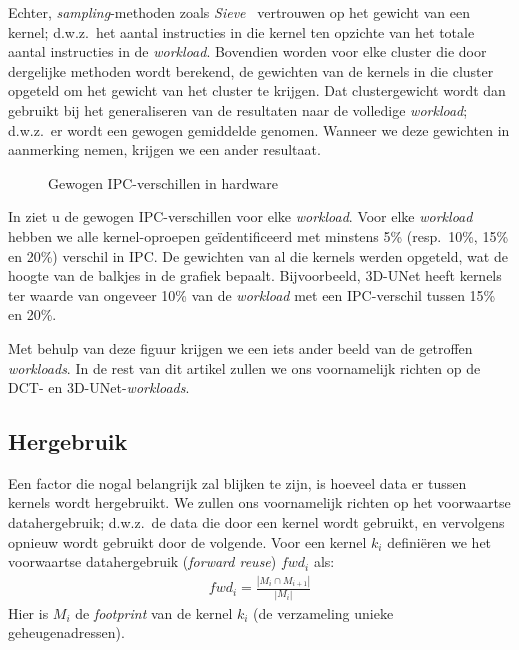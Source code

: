 \documentclass[5p,numvwe]{elsarticle}
\begin{document}
    Echter, \textit{sampling}-methoden zoals \textit{Sieve}~\cite{sieve} vertrouwen op het gewicht van een kernel; d.w.z.\ het aantal instructies in die kernel ten opzichte van het totale aantal instructies in de \textit{workload}.
    Bovendien worden voor elke cluster die door dergelijke methoden wordt berekend, de gewichten van de kernels in die cluster opgeteld om het gewicht van het cluster te krijgen.
    Dat clustergewicht wordt dan gebruikt bij het generaliseren van de resultaten naar de volledige \textit{workload}; d.w.z.\ er wordt een gewogen gemiddelde genomen.
    Wanneer we deze gewichten in aanmerking nemen, krijgen we een ander resultaat.

    \begin{figure}[ht]
        \centering
        \caption{Gewogen IPC-verschillen in hardware}
        \label{fig:w-hw-ipc}
    \end{figure}

    In  ziet u de gewogen IPC-verschillen voor elke \textit{workload}.
    Voor elke \textit{workload} hebben we alle kernel-oproepen geïdentificeerd met minstens 5\% (resp.\ 10\%, 15\% en 20\%) verschil in IPC.
    De gewichten van al die kernels werden opgeteld, wat de hoogte van de balkjes in de grafiek bepaalt.
    Bijvoorbeeld, 3D-UNet heeft kernels ter waarde van ongeveer 10\% van de \textit{workload} met een IPC-verschil tussen 15\% en 20\%.

    Met behulp van deze figuur krijgen we een iets ander beeld van de getroffen \textit{workloads}.
    In de rest van dit artikel zullen we ons voornamelijk richten op de DCT- en 3D-UNet-\textit{workloads}.

    \subsection{Hergebruik}\label{subsec:hergebruik}
    Een factor die nogal belangrijk zal blijken te zijn, is hoeveel data er tussen kernels wordt hergebruikt.
    We zullen ons voornamelijk richten op het voorwaartse datahergebruik; d.w.z.\ de data die door een kernel wordt gebruikt, en vervolgens opnieuw wordt gebruikt door de volgende.
    Voor een kernel $k_i$ definiëren we het voorwaartse datahergebruik (\textit{forward reuse}) $fwd_i$ als:
    \begin{align}
        fwd_i = \frac{|M_i \cap M_{i+1}|}{|M_i|}
    \end{align}
    Hier is $M_i$ de \textit{footprint} van de kernel $k_i$ (de verzameling unieke geheugenadressen).
\end{document}
